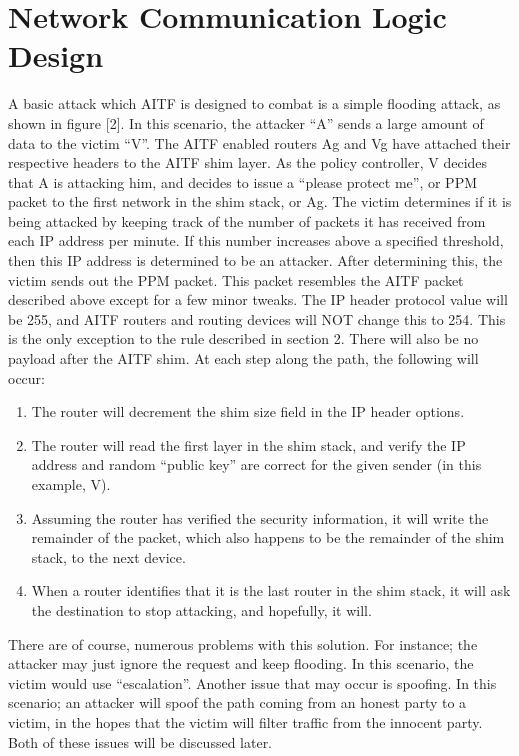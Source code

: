 \documentclass[11pt]{article}
\begin{document}
\section{Network Communication Logic Design}
A basic attack which AITF is designed to combat is a simple flooding attack, as shown in figure [2]. In this scenario, the attacker “A” sends a large amount of data to the victim “V”. The AITF enabled routers Ag and Vg have attached their respective headers to the AITF shim layer. As the policy controller, V decides that A is attacking him, and decides to issue a “please protect me”, or PPM packet to the first network in the shim stack, or Ag.  The victim determines if it is being attacked by keeping track of the number of packets it has received from each IP address per minute. If this number increases above a specified threshold, then this IP address is determined to be an attacker. After determining this, the victim sends out the PPM packet.  This packet resembles the AITF packet described above except for a few minor tweaks. The IP header protocol value will be 255, and AITF routers and routing devices will NOT change this to 254. This is the only exception to the rule described in section 2. There will also be no payload after the AITF shim. At each step along the path, the following will occur:
\begin{enumerate}
	\item The router will decrement the shim size field in the IP header options.
	\item The router will read the first layer in the shim stack, and verify the IP address and random “public key” are correct for the given sender (in this example, V).
	\item Assuming the router has verified the security information, it will write the remainder of the packet, which also happens to be the remainder of the shim stack, to the next device.
	\item When a router identifies that it is the last router in the shim stack, it will ask the destination to stop attacking, and hopefully, it will.
\end{enumerate}
There are of course, numerous problems with this solution. For instance; the attacker may just ignore the request and keep flooding. In this scenario, the victim would use “escalation”. Another issue that may occur is spoofing. In this scenario; an attacker will spoof the path coming from an honest party to a victim, in the hopes that the victim will filter traffic from the innocent party. Both of these issues will be discussed later. 
\end{document}
